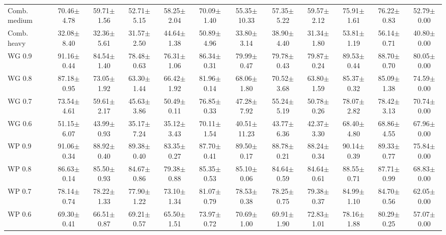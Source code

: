 \begin{table}[!t]
{\begin{tabular}{lccccccccccc}
Comb. medium & 70.46$\pm$4.78 & 59.71$\pm$1.56 & 52.71$\pm$5.15 & 58.25$\pm$2.04 & 70.09$\pm$1.40 & 55.35$\pm$10.33 & 57.35$\pm$5.22 & 59.57$\pm$2.12 & 75.91$\pm$1.61 & 76.22$\pm$0.83 & 52.79$\pm$0.00 \\
Comb. heavy & 32.08$\pm$8.40 & 32.36$\pm$5.61 & 31.57$\pm$2.50 & 44.64$\pm$1.38 & 50.89$\pm$4.96 & 33.80$\pm$3.14 & 38.90$\pm$4.40 & 31.34$\pm$1.80 & 53.81$\pm$1.19 & 56.14$\pm$0.71 & 40.80$\pm$0.00 \\
WG 0.9 & 91.16$\pm$0.44 & 84.54$\pm$1.40 & 78.48$\pm$0.63 & 76.31$\pm$1.06 & 86.34$\pm$0.31 & 79.99$\pm$0.47 & 79.78$\pm$0.43 & 79.87$\pm$0.24 & 89.53$\pm$0.44 & 88.70$\pm$0.70 & 80.05$\pm$0.00 \\
WG 0.8 & 87.18$\pm$0.95 & 73.05$\pm$1.92 & 63.30$\pm$1.44 & 66.42$\pm$1.92 & 81.96$\pm$0.14 & 68.06$\pm$1.80 & 70.52$\pm$3.68 & 63.80$\pm$1.59 & 85.37$\pm$0.32 & 85.09$\pm$1.38 & 74.59$\pm$0.00 \\
WG 0.7 & 73.54$\pm$4.61 & 59.61$\pm$2.17 & 45.63$\pm$3.86 & 50.49$\pm$0.11 & 76.85$\pm$0.33 & 47.28$\pm$7.92 & 55.24$\pm$5.19 & 50.78$\pm$0.26 & 78.07$\pm$2.82 & 78.42$\pm$3.13 & 70.74$\pm$0.00 \\
WG 0.6 & 51.15$\pm$6.07 & 43.99$\pm$0.93 & 35.17$\pm$7.24 & 35.12$\pm$3.43 & 70.11$\pm$1.54 & 40.51$\pm$11.23 & 43.77$\pm$6.36 & 42.37$\pm$3.30 & 68.40$\pm$4.80 & 68.86$\pm$4.55 & 67.96$\pm$0.00 \\
WP 0.9 & 91.06$\pm$0.34 & 88.92$\pm$0.40 & 89.38$\pm$0.40 & 83.35$\pm$0.27 & 87.70$\pm$0.41 & 89.50$\pm$0.17 & 88.78$\pm$0.21 & 88.24$\pm$0.34 & 90.14$\pm$0.39 & 89.33$\pm$0.77 & 75.84$\pm$0.00 \\
WP 0.8 & 86.63$\pm$0.14 & 85.50$\pm$0.93 & 84.67$\pm$0.86 & 79.38$\pm$0.88 & 85.35$\pm$0.53 & 85.10$\pm$0.06 & 84.64$\pm$0.59 & 84.64$\pm$0.61 & 88.55$\pm$0.71 & 87.71$\pm$0.99 & 68.83$\pm$0.00 \\
WP 0.7 & 78.14$\pm$0.74 & 78.22$\pm$1.33 & 77.90$\pm$1.22 & 73.10$\pm$1.34 & 81.07$\pm$0.79 & 78.53$\pm$0.38 & 78.25$\pm$0.75 & 79.38$\pm$0.37 & 84.99$\pm$1.10 & 84.70$\pm$0.56 & 62.05$\pm$0.00 \\
WP 0.6 & 69.30$\pm$0.41 & 66.51$\pm$0.87 & 69.21$\pm$0.57 & 65.50$\pm$1.51 & 73.97$\pm$0.72 & 70.69$\pm$1.00 & 69.91$\pm$1.90 & 72.83$\pm$1.01 & 78.16$\pm$1.88 & 80.29$\pm$0.25 & 57.07$\pm$0.00 \\
\hline
\end{tabular}}
\end{table}
